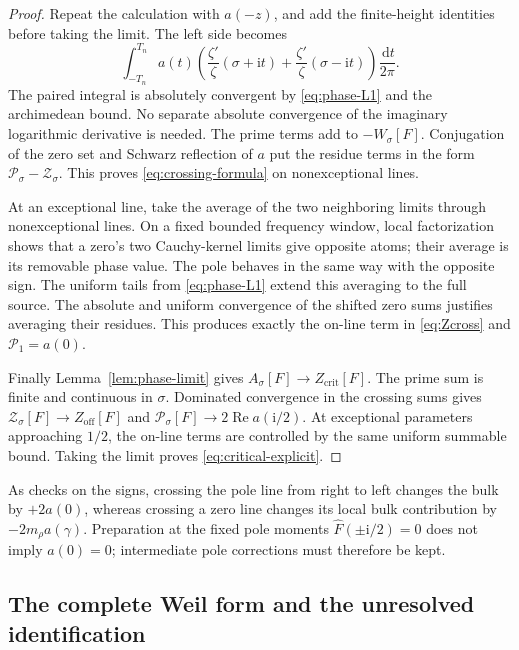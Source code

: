\documentclass[11pt]{article}
\numberwithin{equation}{section}
\theoremstyle{definition}
\theoremstyle{remark}
\newcommand{\Rea}{\operatorname{Re}}
\newcommand{\ii}{\mathrm i}
\newcommand{\dd}{\,\mathrm d}
\newcommand{\Zcrit}{Z_{\mathrm{crit}}}
\newcommand{\Zoff}{Z_{\mathrm{off}}}
\begin{document}
\begin{proof}
Repeat the calculation with \(a(-z)\), and add the finite-height
identities before taking the limit. The left side becomes
\[
\int_{-T_n}^{T_n}a(t)
\left(\frac{\zeta'}{\zeta}(\sigma+\ii t)+
\frac{\zeta'}{\zeta}(\sigma-\ii t)\right)\frac{\dd t}{2\pi}.
\]
The paired integral is absolutely convergent by
\eqref{eq:phase-L1} and the archimedean bound.
No separate absolute convergence of the imaginary logarithmic
derivative is needed. The prime terms add to \(-W_\sigma[F]\).
Conjugation of the zero set and Schwarz reflection of \(a\)
put the residue terms in the form
\(\mathcal P_\sigma-\mathcal Z_\sigma\).
This proves \eqref{eq:crossing-formula} on nonexceptional lines.

At an exceptional line, take the average of the two neighboring
limits through nonexceptional lines. On a fixed bounded frequency
window, local factorization shows that a zero's two Cauchy-kernel
limits give opposite atoms; their average is its removable phase
value. The pole behaves in the same way with the opposite sign.
The uniform tails from \eqref{eq:phase-L1} extend this averaging
to the full source. The absolute and uniform convergence of the
shifted zero sums justifies averaging their residues. This produces
exactly the on-line term in \eqref{eq:Zcross} and
\(\mathcal P_1=a(0)\).

Finally Lemma~\ref{lem:phase-limit} gives
\(A_\sigma[F]\to\Zcrit[F]\). The prime sum is finite and
continuous in \(\sigma\). Dominated convergence in the crossing
sums gives
\(\mathcal Z_\sigma[F]\to\Zoff[F]\) and
\(\mathcal P_\sigma[F]\to2\Rea a(\ii/2)\).
At exceptional parameters approaching \(1/2\), the on-line
terms are controlled by the same uniform summable bound.
Taking the limit proves \eqref{eq:critical-explicit}.
\end{proof}

As checks on the signs, crossing the pole line from right to left
changes the bulk by \(+2a(0)\), whereas crossing a zero line changes
its local bulk contribution by \(-2m_\rho a(\gamma)\).
Preparation at the fixed pole moments
\(\widehat F(\pm\ii/2)=0\) does not imply \(a(0)=0\);
intermediate pole corrections must therefore be kept.

\subsection{The complete Weil form and the unresolved identification}
\end{document}
